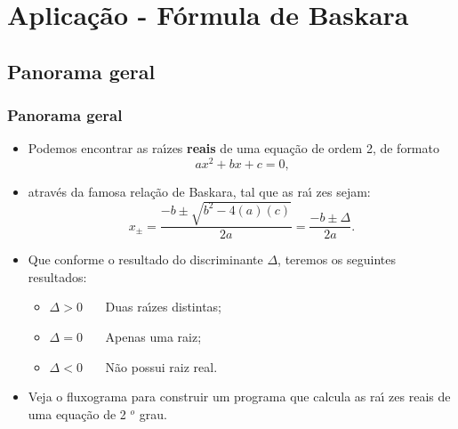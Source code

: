 \documentclass[xcolor=table]{beamer}
\newenvironment{stepitemize}{\begin{itemize}[<+->]}{\end{itemize} }
\begin{document}
\section{Aplica\c{c}\~{a}o - F\'{o}rmula de Baskara}

\subsection{Panorama geral}

\begin{frame}%

\frametitle{Panorama geral}

\begin{stepitemize}
\item Podemos encontrar as ra\'{\i}zes \textbf{reais} de uma equa\c{c}\~{a}o
de ordem 2, de formato%
\[
ax^{2}+bx+c=0\text{,} 
\]

\item atrav\'{e}s da famosa rela\c{c}\~{a}o de Baskara, tal que as ra\'{\i}%
zes sejam:%
\[
x_{\pm }=\frac{-b\pm \sqrt{b^{2}-4\left( a\right) \left( c\right) }}{2a}=%
\frac{-b\pm \Delta }{2a}. 
\]

\item Que conforme o resultado do discriminante $\Delta $, teremos os
seguintes resultados:

\begin{itemize}
\item $\Delta >0$ \ \ \ Duas ra\'{\i}zes distintas;

\item $\Delta =0$ \ \ \ Apenas uma raiz;

\item $\Delta <0$ \ \ \ N\~{a}o possui raiz real.
\end{itemize}

\item Veja o fluxograma para construir um programa que calcula as ra\'{\i}%
zes reais de uma equa\c{c}\~{a}o de 2%
${{}^o}$
grau.
\end{stepitemize}

\transboxout%
\end{frame}%
\end{document}
